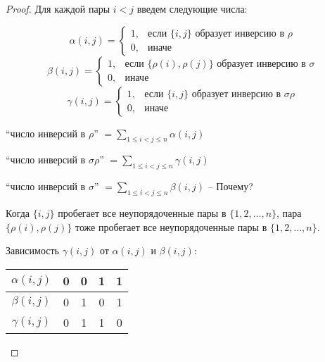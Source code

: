 \documentclass[a4paper]{article}
\begin{document}
\begin{colloq}
            \begin{proof}
                Для каждой пары $i < j$ введем следующие числа:

                \begin{equation*}
                    \alpha(i,j) = \begin{cases}
                        1, &\text{если } \{i, j\} \text{ образует инверсию в } \rho \\
                        0, &\text{иначе}
                    \end{cases}
                \end{equation*}
                \begin{equation*}
                    \beta(i,j) = \begin{cases}
                        1, &\text{если }  \{\rho(i), \rho(j)\} \text{ образует инверсию в } \sigma \\
                        0, &\text{иначе}
                    \end{cases}
                \end{equation*}
                \begin{equation*}
                    \gamma(i,j) = \begin{cases}
                        1, &\text{если }  \{i, j\} \text{ образует инверсию в } \sigma \rho \\
                        0, &\text{иначе}
                    \end{cases}
                \end{equation*}

                \everymath{\displaystyle}

                ``число инверсий в $\rho$'' $= \sum_{1 \leq i < j \leq n} \alpha(i, j) $

                ``число инверсий в $\sigma \rho$'' $= \sum_{1 \leq i < j \leq n} \gamma(i, j) $

                ``число инверсий в $\sigma$'' $= \sum_{1 \leq i < j \leq n} \beta(i, j)$ -- Почему?

                Когда $\{i, j\}$ пробегает все неупорядоченные пары в $\{1, 2, \dots, n\}$, пара $\{\rho(i), \rho(j)\}$ тоже пробегает все неупорядоченные пары в $\{1, 2, \dots, n\}$.

                \bigskip
                Зависимость $\gamma(i,j)$ от $\alpha(i,j)$ и $\beta(i,j)$:
                \begin{table}[!ht]
                    \begin{center}
                        \begin{tabular}{c|c|c|c|c}
                            $\alpha(i,j)$ & 0 & 0 & 1 & 1 \\
                            \hline
                            $\beta(i,j)$ & 0 & 1 & 0 & 1 \\
                            \hline
                            $\gamma(i,j)$ & 0 & 1 & 1 & 0 \\
                        \end{tabular}
                    \end{center}
                \end{table}


\end{proof}
\end{colloq}
\end{document}
